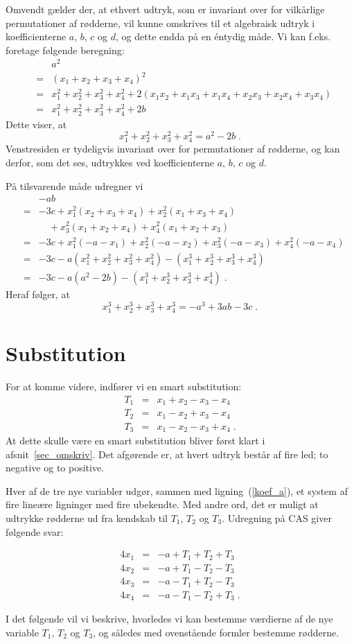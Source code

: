\documentclass[12pt,oneside,a4paper]{article}
\newcommand{\bas}{\begin{eqnarray*}}
\newcommand{\eas}{\end{eqnarray*}}
\newcommand{\bea}{\begin{eqnarray}}
\newcommand{\eea}{\end{eqnarray}}
\begin{document}
Omvendt gælder der, at ethvert udtryk, som er invariant over for vilkårlige
permutationer af rødderne, vil kunne omskrives til et algebraisk udtryk i 
koefficienterne $a$, $b$, $c$ og $d$, og dette endda på en éntydig måde.
Vi kan f.eks. foretage følgende beregning:
\bas
 && a^2 \\
 &=& (x_1+x_2+x_3+x_4)^2  \\
 &=& x_1^2+x_2^2+x_3^2+x_4^2 + 2(x_1x_2+x_1x_3+x_1x_4 +x_2x_3+x_2x_4+x_3x_4)\\
 &=& x_1^2+x_2^2+x_3^2+x_4^2 + 2b
\eas
Dette viser, at 
\begin{equation}
    x_1^2 + x_2^2 + x_3^2 + x_4^2 = a^2 - 2b\;.
\end{equation}
Venstresiden er tydeligvis invariant over for permutationer af rødderne, og
kan derfor, som det ses, udtrykkes ved koefficienterne $a$, $b$, $c$ og $d$.

På tilsvarende måde udregner vi
\bas
 && -ab \\
 &=& -3c + x_1^2(x_2+x_3+x_4) + x_2^2(x_1+x_3+x_4) \\
 && \quad + x_3^2(x_1+x_2+x_4) + x_4^2(x_1+x_2+x_3) \\
 &=& -3c + x_1^2(-a-x_1) + x_2^2(-a-x_2) + x_3^2(-a-x_3) + x_4^2(-a-x_4) \\
 &=& -3c - a(x_1^2+x_2^2+x_3^2+x_4^2) - (x_1^3+x_2^3+x_3^3+x_4^3) \\
 &=& -3c - a(a^2-2b) - (x_1^3+x_2^3+x_3^3+x_4^3) \;.
\eas
Heraf følger, at 
\begin{equation}
x_1^3+x_2^3+x_3^3+x_4^3 = -a^3 + 3ab - 3c \;.
\end{equation}

\section{Substitution} \label{sec_subst}
For at komme videre, indfører vi en smart substitution:
\bea
    T_1 &=& x_1 + x_2 - x_3 - x_4 \label{subst_t1}\\
    T_2 &=& x_1 - x_2 + x_3 - x_4 \label{subst_t2}\\
    T_3 &=& x_1 - x_2 - x_3 + x_4 \label{subst_t3}\;.
\eea
At dette skulle være en smart substitution bliver først klart i
afsnit~\ref{sec_omskriv}.  Det afgørende er, at hvert udtryk består af fire
led; to negative og to positive.

Hver af de tre nye variabler udgør, sammen med ligning~(\ref{koef_a}), et
system af fire lineære ligninger med fire ubekendte.  Med andre ord, det er
muligt at udtrykke rødderne ud fra kendskab til $T_1$, $T_2$ og $T_3$.
Udregning på CAS giver følgende svar:
\begin{tcolorbox}
\bea
    4x_1 &=& -a + T_1 + T_2 + T_3 \label{x1} \\
    4x_2 &=& -a + T_1 - T_2 - T_3 \label{x2} \\
    4x_3 &=& -a - T_1 + T_2 - T_3 \label{x3} \\
    4x_4 &=& -a - T_1 - T_2 + T_3 \label{x4} \;.
\eea
\end{tcolorbox}
I det følgende vil vi beskrive, hvorledes vi kan bestemme værdierne af de nye
variable $T_1$, $T_2$ og $T_3$, og således med ovenstående formler bestemme
rødderne.
\end{document}
